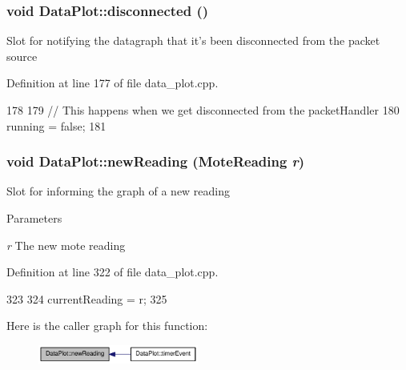 \hypertarget{classDataPlot_a78920a414abdfa954fd34c662f39d09e}{
\subsubsection[{disconnected}]{\setlength{\rightskip}{0pt plus 5cm}void DataPlot::disconnected ()}}
\label{classDataPlot_a78920a414abdfa954fd34c662f39d09e}
Slot for notifying the datagraph that it's been disconnected from the packet source 

Definition at line 177 of file data\_\-plot.cpp.




\begin{DoxyCode}
178 {
179       // This happens when we get disconnected from the packetHandler
180       running = false;
181 }
\end{DoxyCode}


\hypertarget{classDataPlot_a36fe7e25f67a168d4f7dd2eaa2627003}{
\subsubsection[{newReading}]{\setlength{\rightskip}{0pt plus 5cm}void DataPlot::newReading ({\bf MoteReading} {\em r})}}
\label{classDataPlot_a36fe7e25f67a168d4f7dd2eaa2627003}
Slot for informing the graph of a new reading 
\begin{DoxyParams}{Parameters}
\item[{\em r}]The new mote reading \end{DoxyParams}


Definition at line 322 of file data\_\-plot.cpp.




\begin{DoxyCode}
323 {
324     currentReading = r;
325 }
\end{DoxyCode}




Here is the caller graph for this function:\nopagebreak
\begin{figure}[H]
\begin{center}
\leavevmode
\includegraphics[width=149pt]{classDataPlot_a36fe7e25f67a168d4f7dd2eaa2627003_icgraph}
\end{center}
\end{figure}


